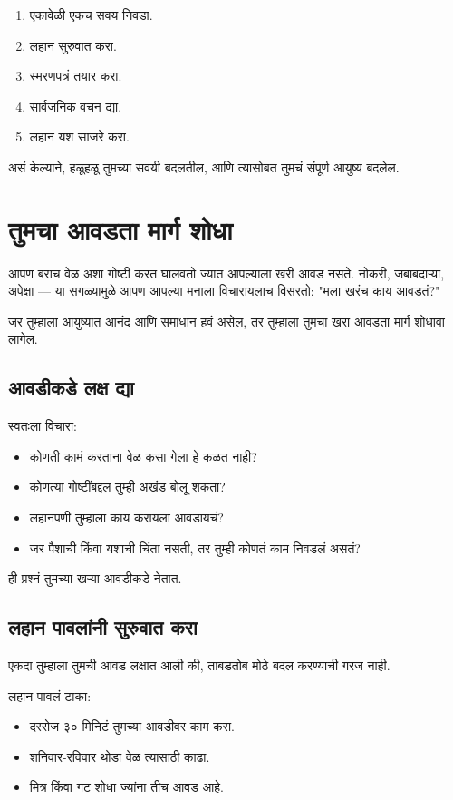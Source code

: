 \begin{enumerate}
\item एकावेळी एकच सवय निवडा.  
\item लहान सुरुवात करा.  
\item स्मरणपत्रं तयार करा.  
\item सार्वजनिक वचन द्या.  
\item लहान यश साजरे करा.  
\end{enumerate}

असं केल्याने,  
हळूहळू तुमच्या सवयी बदलतील,  
आणि त्यासोबत तुमचं संपूर्ण आयुष्य बदलेल.  



\chapter{तुमचा आवडता मार्ग शोधा}

आपण बराच वेळ अशा गोष्टी करत घालवतो  
ज्यात आपल्याला खरी आवड नसते.  
नोकरी, जबाबदाऱ्या, अपेक्षा —  
या सगळ्यामुळे आपण आपल्या मनाला विचारायलाच विसरतो:  
"मला खरंच काय आवडतं?"  

जर तुम्हाला आयुष्यात आनंद आणि समाधान हवं असेल,  
तर तुम्हाला तुमचा खरा आवडता मार्ग शोधावा लागेल.  

\section*{आवडीकडे लक्ष द्या}
स्वतःला विचारा:  
\begin{itemize}
\item कोणती कामं करताना वेळ कसा गेला हे कळत नाही?  
\item कोणत्या गोष्टींबद्दल तुम्ही अखंड बोलू शकता?  
\item लहानपणी तुम्हाला काय करायला आवडायचं?  
\item जर पैशाची किंवा यशाची चिंता नसती,  
तर तुम्ही कोणतं काम निवडलं असतं?  
\end{itemize}

ही प्रश्नं तुमच्या खऱ्या आवडीकडे नेतात.  

\section*{लहान पावलांनी सुरुवात करा}
एकदा तुम्हाला तुमची आवड लक्षात आली की,  
ताबडतोब मोठे बदल करण्याची गरज नाही.  

लहान पावलं टाका:  
\begin{itemize}
\item दररोज ३० मिनिटं तुमच्या आवडीवर काम करा.  
\item शनिवार-रविवार थोडा वेळ त्यासाठी काढा.  
\item मित्र किंवा गट शोधा ज्यांना तीच आवड आहे.  
\end{itemize}

